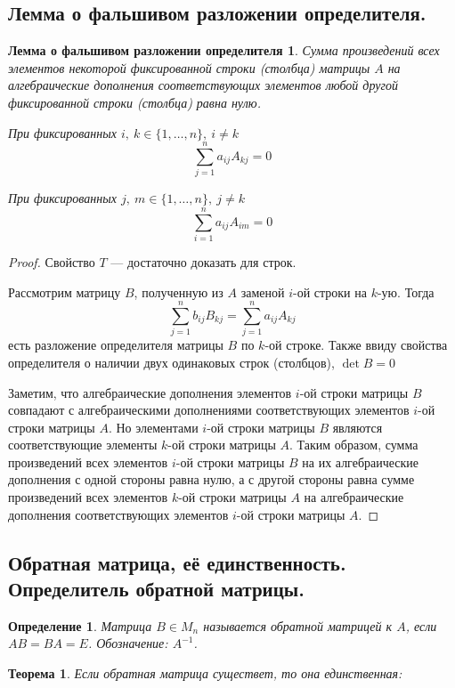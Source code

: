 \documentclass[a4paper, 12pt]{article}
\newtheorem*{theorem}{Теорема}
\newtheorem*{definition}{Определение}
\newtheorem*{fake-determinant}{Лемма о фальшивом разложении определителя}
\begin{document}
\subsection{Лемма о фальшивом разложении определителя.}

\begin{fake-determinant}
Сумма произведений всех элементов некоторой фиксированной строки (столбца) матрицы $A$ на алгебраические дополнения соответствующих элементов любой другой фиксированной строки (столбца) равна нулю.
\vspace{0.5cm}

При фиксированных $i,\ k \in \{1, \ldots, n\},\ i \ne k$
$$ \sum_{j=1}^n a_{ij} A_{kj} = 0 $$

При фиксированных $j,\ m \in \{1, \ldots, n\},\ j \ne k$
$$ \sum_{i=1}^n a_{ij} A_{im} = 0 $$
\end{fake-determinant}

\begin{proof}
Свойство $T$ --- достаточно доказать для строк.

Рассмотрим матрицу $B$, полученную из $A$ заменой $i$-ой строки на $k$-ую.
Тогда  
\[
\sum_{j=1}^n b_{ij} B_{kj} = 
\sum_{j=1}^n a_{ij} A_{kj}
\]
есть разложение определителя матрицы $B$ по $k$-ой строке.
Также ввиду свойства определителя о наличии двух одинаковых строк (столбцов), $\det{B} = 0$

Заметим, что алгебраические дополнения элементов $i$-ой строки матрицы $B$ совпадают с алгебраическими дополнениями соответствующих элементов $i$-ой строки матрицы $A$. 
Но элементами $i$-ой строки матрицы $B$ являются соответствующие элементы $k$-ой строки матрицы $A$. 
Таким образом, сумма произведений всех элементов $i$-ой строки матрицы $B$ на их алгебраические дополнения с одной стороны равна нулю, 
а с другой стороны равна сумме произведений всех элементов $k$-ой строки матрицы $A$ на алгебраические дополнения соответствующих элементов $i$-ой строки матрицы $A$.
\end{proof}

\subsection{Обратная матрица, её единственность. Определитель обратной матрицы.}
\begin{definition}
Матрица $B \in M_n$ называется \textit{обратной матрицей} к $A$, если $AB = BA = E$. Обозначение: $A^{-1}$.
\end{definition}
\begin{theorem}
Если обратная матрица существет, то она \textit{единственная}:
\end{theorem}
\end{document}
